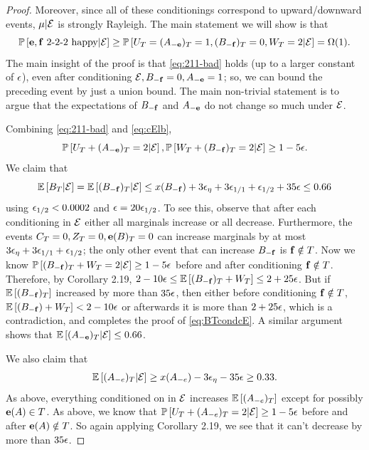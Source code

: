 \begin{proof}
Moreover, since all of these conditionings correspond to upward/downward events,  $\mu | {\cal E}$ is strongly Rayleigh.
The main statement we will show is that $${\mathbb{P}}\left[{\bf e},{\bf f}\text{ 2-2-2 happy}|{\cal E}\right]\ge {\mathbb{P}}\left[U_T=(A_{-{\bf e}})_T=1, (B_{-{\bf f}})_T=0,W_T=2|{\cal E}\right]= \Omega(1).$$
The main insight of the proof is that \cref{eq:211-bad} holds (up to a larger constant of ${\epsilon}$), even after conditioning ${\cal E}, B_{-{\bf f}}=0,A_{-{\bf e}}=1$; so, we can bound the preceding event by just a union bound. The main non-trivial statement is to argue that the expectations of $B_{-{\bf f}}$ and $A_{-{\bf e}}$ do not change so much under ${\cal E}$.

Combining \eqref{eq:211-bad} and \eqref{eq:cElb},
\begin{equation}\label{eq:211-badcE} {\mathbb{P}}\left[U_T+(A_{-{\bf e}})_T=2 | {\cal E}\right],{\mathbb{P}}\left[W_T+(B_{-{\bf f}})_T=2 | {\cal E}\right]\geq 1-5{\epsilon}.	
\end{equation}
We claim that 
\begin{equation}
\label{eq:BTcondcE}
	\E{B_T | \cE}=\E{(B_{-\bbf})_T|\cE} \leq x(B_{-\bbf}) + 3\eps_\eta+ 3\eps_{1/1}+ \eps_{1/2} +35 \eps \leq 0.66 %
\end{equation}
using ${\epsilon}_{1/2}<0.0002$ and ${\epsilon}= 20{\epsilon}_{1/2}$.
To see this, observe that after each conditioning in ${\cal E}$ either all marginals increase or all decrease. Furthermore, the events $C_T=0, Z_T=0, {\bf e}(B)_T=0$ can increase marginals by at most $3{\epsilon}_\eta+3{\epsilon}_{1/1}+{\epsilon}_{1/2}$; the only other event that can increase $B_{-{\bf f}}$ is ${\bf f}\notin T$. Now 
we know ${\mathbb{P}}\left[(B_{-{\bf f}})_T+W_T=2 |{\cal E}\right]\geq 1-5{\epsilon}$ before and after conditioning ${\bf f}\notin T$. Therefore, by Corollary 2.19, $2-10{\epsilon} \leq {\mathbb{E}}\left[(B_{-{\bf f}})_T+W_T\right]\leq 2+25{\epsilon}$. 
But if ${\mathbb{E}}\left[(B_{-{\bf f}})_T\right]$ increased by more than $35{\epsilon}$, then either before conditioning ${\bf f}\notin T$,  ${\mathbb{E}}\left[(B_{-{\bf f}})+W_T\right]<2-10{\epsilon}$ or afterwards it is more than $2+25{\epsilon}$, which is a contradiction, and completes the proof of \eqref{eq:BTcondcE}.
A similar argument shows that ${\mathbb{E}}\left[(A_{-{\bf e}})_T|{\cal E}\right]\leq 0.66$.

We also claim that
$${\mathbb{E}}\left[(A_{-e})_T | {\cal E}\right] \geq x(A_{-e}) - 3{\epsilon}_{\eta} -35{\epsilon} \ge 0.33.$$
As above, everything conditioned on in ${\cal E}$ increases ${\mathbb{E}}\left[(A_{-e})_T \right]$ except for possibly ${\bf e}(A)\in T$.  As above, we know that ${\mathbb{P}}\left[U_T+(A_{-e})_T=2 |{\cal E}\right]\geq 1-5{\epsilon}$ before and after ${\bf e}(A)\notin T$. So again applying Corollary 2.19, we see that it can't decrease by more than $35 {\epsilon}$.



\end{proof}
